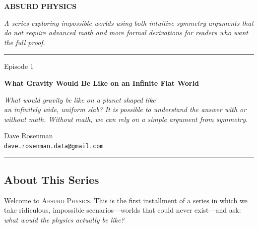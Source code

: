 \documentclass[11pt, letterpaper]{article}
\newcommand{\seriesname}{\textsc{Absurd Physics}}
\begin{document}

\begin{center}
\vspace*{1.5cm}

{\fontsize{36}{42}\selectfont\bfseries\textcolor{accentblue}{ABSURD PHYSICS}}

\vspace{8pt}
{\large\textcolor{seriestitle}{\textit{A series exploring impossible worlds using both intuitive symmetry arguments that do not require advanced math and more formal derivations for readers who want the full proof.}}}

\vspace{1.5cm}
\rule{0.6\textwidth}{0.5pt}
\vspace{1.5cm}

{\fontsize{24}{30}\selectfont Episode 1}

\vspace{10pt}

{\fontsize{28}{34}\selectfont\bfseries What Gravity Would Be Like on an Infinite Flat World}

\vspace{8pt}
{\large\textit{What would gravity be like on a planet shaped like\\an infinitely wide, uniform slab? It is possible to understand the answer with or without math. Without math, we can rely on a simple argument from symmetry.}}

\vspace{1.5cm}

{\large Dave Rosenman}\\[4pt]
{\normalsize \texttt{dave.rosenman.data@gmail.com}}

\vspace{1.5cm}
\rule{0.6\textwidth}{0.5pt}
\end{center}

\vspace{1cm}

\subsection*{About This Series}

Welcome to \seriesname. This is the first installment of a series in which we take ridiculous, impossible scenarios---worlds that could never exist---and ask: \textit{what would the physics actually be like?}
\end{document}

